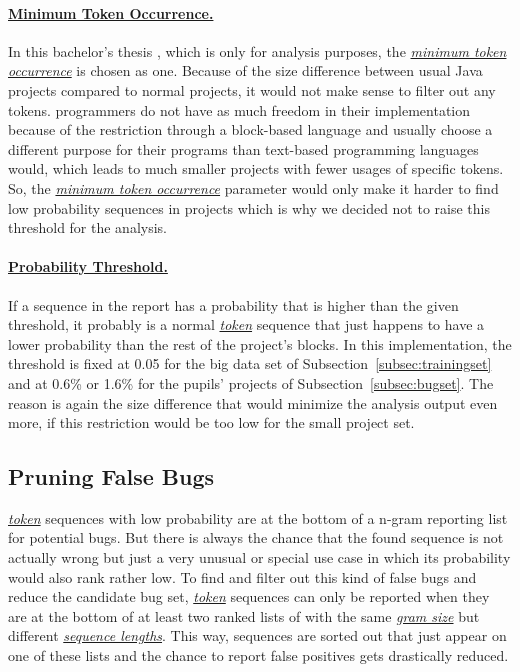 \paragraph{\hyperref[def:minimum_token_occurrence]{Minimum Token Occurrence.}}
In this bachelor's thesis \ngram{}, which is only for \scratch{} analysis purposes, the \hyperref[def:minimum_token_occurrence]{\textit{minimum token occurrence}} is chosen as one. Because of the size difference between usual Java projects compared to normal \scratch{} projects, it would not make sense to filter out any tokens. \scratch{} programmers do not have as much freedom in their implementation because of the restriction through a block-based language and usually choose a different purpose for their programs than text-based programming languages would, which leads to much smaller projects with fewer usages of specific tokens. So, the \hyperref[def:minimum_token_occurrence]{\textit{minimum token occurrence}} parameter would only make it harder to find low probability sequences in projects which is why we decided not to raise this threshold for the analysis.

\paragraph{\hyperref[def:probability_threshold]{Probability Threshold.}}
If a sequence in the report has a probability that is higher than the given threshold, it probably is a normal \hyperref[def:token]{\textit{token}} sequence that just happens to have a lower probability than the rest of the project's blocks. In this implementation, the threshold is fixed at 0.05 for the big data set of Subsection~\ref{subsec:trainingset} and at 0.6\% or 1.6\% for the pupils' projects of Subsection~\ref{subsec:bugset}. The reason is again the size difference that would minimize the analysis output even more, if this restriction would be too low for the small project set.

\subsection{Pruning False Bugs}\label{subsec:false_bugs}
\hyperref[def:token]{\textit{token}} sequences with low probability are at the bottom of a n-gram reporting list for potential bugs. But there is always the chance that the found sequence is not actually wrong but just a very unusual or special use case in which its probability would also rank rather low. To find and filter out this kind of false bugs and reduce the candidate bug set, \hyperref[def:token]{\textit{token}} sequences can only be reported when they are at the bottom of at least two ranked lists of  with the same \hyperref[def:gram_size]{\textit{gram size}} but different \hyperref[def:sequence_length]{\textit{sequence lengths}}. This way, sequences are sorted out that just appear on one of these lists and the chance to report false positives gets drastically reduced. 


